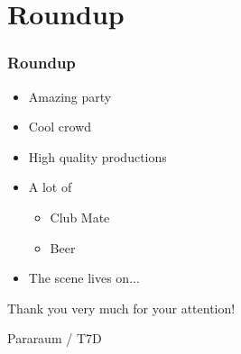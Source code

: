 \documentclass{beamer}
\begin{document}
\section{Roundup}
\begin{frame}
  \frametitle{Roundup}
  \begin{itemize}
  \item Amazing party
  \item Cool crowd
  \item High quality productions
  \item A lot of
    \begin{itemize}
    \item Club Mate
    \item Beer
    \end{itemize}
  \item The scene lives on...
  \end{itemize}

  Thank you very much for your attention!
  \begin{flushright}
    Pararaum / T7D
  \end{flushright}
\end{frame}
\end{document}
